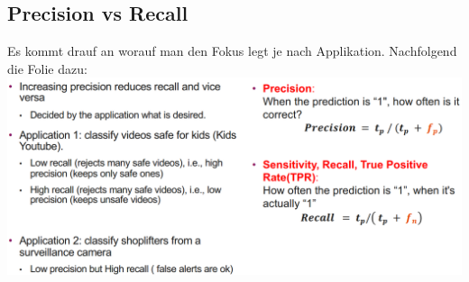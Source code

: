 \subsection{Precision vs Recall}
Es kommt drauf an worauf man den Fokus legt je nach Applikation. Nachfolgend die Folie dazu:
\includegraphics[width=\linewidth]{img/precision_vs_recall.png}
